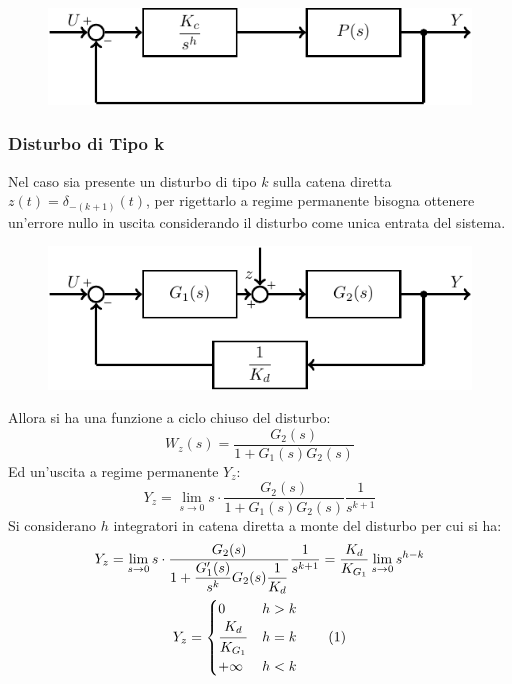 \documentclass{article}
\numberwithin{equation}{subsection}
\newcommand{\tageq}{\tag{\stepcounter{equation}\theequation}}
\newcommand{\Frac}[2]{\displaystyle\frac{\strut{#1}}{\strut{#2}}}
\begin{document}
\begin{figure}[H]%
    \centering
    \includegraphics{controllore-4.pdf}%
\end{figure}

\subsubsection{Disturbo di Tipo k}
\label{sec:disturbo-k}
Nel caso sia presente un disturbo di tipo $k$ sulla catena diretta $z(t)=\delta_{-(k+1)}(t)$, per rigettarlo a regime permanente bisogna ottenere un'errore nullo in uscita 
considerando il disturbo come unica entrata del sistema. 

\begin{figure}[H]%
    \centering
    \includegraphics{disturbo-k.pdf}%
\end{figure}

Allora si ha una funzione a ciclo chiuso del disturbo:
\begin{equation}
    W_z(s)=\displaystyle\frac{G_2(s)}{1+G_1(s)G_2(s)}
\end{equation}
Ed un'uscita a regime permanente $Y_z$:
\begin{equation*}
    Y_z=\lim_{s\to0}s\cdot\displaystyle\frac{G_2(s)}{1+G_1(s)G_2(s)}\frac{1}{s^{k+1}}
\end{equation*}
Si considerano $h$ integratori in catena diretta a monte del disturbo per cui si ha:
\begin{gather*}
    Y_z=\lim_{s\to0}s\cdot\displaystyle\frac{G_2(s)}{1+\displaystyle\frac{G_1'(s)}{s^k}G_2(s)\frac{1}{K_d}}\frac{1}{s^{k+1}}=\frac{K_d}{K_{G_1}}\lim_{s\to0}s^{h-k}\\
    Y_z=
    \begin{cases}
        0 &h>k\\
        \displaystyle\Frac{K_d}{K_{G_1}} &h=k\\
        +\infty &h<k
    \end{cases}\tageq
\end{gather*}
\end{document}
